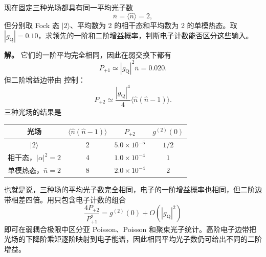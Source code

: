 \begin{exbox}[相同平均光子数的不同电子谱]
现在固定三种光场都具有同一平均光子数
\begin{equation*}
 \bar n=\langle\hat n\rangle=2,
\end{equation*}
但分别取 Fock 态 $|2\rangle$、平均数为 2 的相干态和平均数为 2 的单模热态。取 $|g_{\mathrm Q}|=0.10$，求领先的一阶和二阶增益概率，判断电子计数能否区分这些输入。

\textbf{解。} 它们的一阶平均完全相同，因此在弱交换下都有
\begin{equation*}
 P_{+1}\simeq|g_{\mathrm Q}|^2\bar n=0.020.
\end{equation*}
但二阶增益边带由 控制：
\begin{equation*}
 P_{+2}
 \simeq\frac{|g_{\mathrm Q}|^4}{4}
 \langle\hat n(\hat n-1)\rangle.
\end{equation*}
三种光场的结果是
\begin{center}
\begin{tabular}{c|c|c|c}
 光场 & $\langle\hat n(\hat n-1)\rangle$ & $P_{+2}$ & $g^{(2)}(0)$\\\hline
 $|2\rangle$ & 2 & $5.0\times10^{-5}$ & $1/2$\\
 相干态，$|\alpha|^2=2$ & 4 & $1.0\times10^{-4}$ & $1$\\
 单模热态，$\bar n=2$ & 8 & $2.0\times10^{-4}$ & $2$
\end{tabular}
\end{center}
也就是说，三种场的平均光子数完全相同，电子的一阶增益概率也相同，但二阶边带相差四倍。用只包含电子计数的组合
\begin{equation}
 \boxed{
 \frac{4P_{+2}}{P_{+1}^2}
 =g^{(2)}(0)+O(|g_{\mathrm Q}|^2)}
 \label{eq:qpinem-g2-electron-ratio-dp65}
\end{equation}
即可在弱耦合极限中区分亚 Poisson、Poisson 和聚束光子统计。高阶电子边带把光场的下降阶乘矩逐阶映射到电子能谱，因此相同平均光子数仍可给出不同的二阶增益。
\end{exbox}

